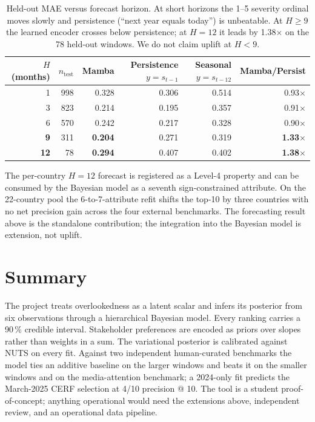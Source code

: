 \documentclass[11pt,a4paper]{article}
\begin{document}
\begin{table}[H]
\centering
\small
\begin{tabular}{@{}rrrrrr@{}}
\toprule
\textbf{$H$ (months)} & \textbf{$n_{\text{test}}$} & \textbf{Mamba} & \textbf{Persistence $y=s_{t-1}$} & \textbf{Seasonal $y=s_{t-12}$} & \textbf{Mamba/Persist} \\
\midrule
 1 & 998 & 0.328 & 0.306 & 0.514 & 0.93$\times$ \\
 3 & 823 & 0.214 & 0.195 & 0.357 & 0.91$\times$ \\
 6 & 570 & 0.242 & 0.217 & 0.328 & 0.90$\times$ \\
\textbf{9} & 311 & \textbf{0.204} & 0.271 & 0.319 & \textbf{1.33$\times$} \\
\textbf{12} & 78 & \textbf{0.294} & 0.407 & 0.402 & \textbf{1.38$\times$} \\
\bottomrule
\end{tabular}
\caption{Held-out MAE versus forecast horizon. At short horizons the 1--5
severity ordinal moves slowly and persistence (``next year equals today'')
is unbeatable. At $H \geq 9$ the learned encoder crosses below persistence;
at $H = 12$ it leads by 1.38$\times$ on the 78 held-out windows. We do not
claim uplift at $H < 9$.\label{tab:forecast}}
\end{table}

The per-country $H = 12$ forecast is registered as a Level-4 property and
can be consumed by the Bayesian model as a seventh sign-constrained attribute.
On the 22-country pool the 6-to-7-attribute refit shifts the top-10 by three
countries with no net precision gain across the four external benchmarks.
The forecasting result above is the standalone contribution; the integration
into the Bayesian model is extension, not uplift.

\section{Summary}

The project treats overlookedness as a latent scalar and infers its posterior
from six observations through a hierarchical Bayesian model. Every ranking
carries a 90\,\% credible interval. Stakeholder preferences are encoded as
priors over slopes rather than weights in a sum. The variational posterior
is calibrated against NUTS on every fit. Against two independent human-curated
benchmarks the model ties an additive baseline on the larger windows and
beats it on the smaller windows and on the media-attention benchmark; a
2024-only fit predicts the March-2025 CERF selection at 4/10 precision @ 10.
The tool is a student proof-of-concept; anything operational would need the
extensions above, independent review, and an operational data pipeline.
\end{document}
